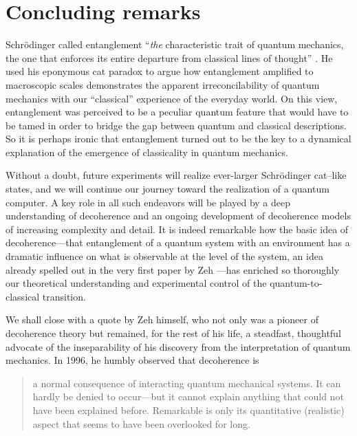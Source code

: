 \documentclass[3p,sort&compress]{elsarticle}
\begin{document}
\section{\label{sec:concluding-remarks}Concluding remarks}

Schr\"odinger called entanglement ``\emph{the} characteristic trait of quantum mechanics, the one that enforces its entire departure from classical lines of thought'' \cite[p.~555]{Schrodinger:1935:jn}. He used his eponymous cat paradox to argue how entanglement amplified to macroscopic scales demonstrates the apparent irreconcilability of quantum mechanics with our ``classical'' experience of the everyday world. On this view, entanglement was perceived to be a peculiar quantum feature that would have to be tamed in order to bridge the gap between quantum and classical descriptions. So it is perhaps ironic that entanglement turned out to be the key to a dynamical explanation of the emergence of classicality in quantum mechanics. 

Without a doubt, future experiments will realize ever-larger Schr\"odinger cat--like states, and we will continue our journey toward the realization of a quantum computer. A key role in all such endeavors will be played by a deep understanding of decoherence and an ongoing development of decoherence models of increasing complexity and detail. It is indeed remarkable how the basic idea of decoherence---that entanglement of a quantum system with an environment has a dramatic influence on what is observable at the level of the system, an idea already spelled out in the very first paper by Zeh \cite{Zeh:1970:yt}---has enriched so thoroughly our theoretical understanding and experimental control of the quantum-to-classical transition. 

We shall close with a quote by Zeh himself, who not only was a pioneer of decoherence theory but remained, for the rest of his life, a steadfast, thoughtful advocate of the inseparability of his discovery from the interpretation of quantum mechanics. In 1996, he humbly observed \cite{Zeh:1996:gy} that decoherence is 
%
\begin{quote}
a normal consequence of interacting quantum mechanical systems. It can hardly be denied to occur---but it cannot explain anything that could not have been explained before. Remarkable is only its quantitative (realistic) aspect that seems to have been overlooked for long. 
\end{quote}
%

\section*{}
\end{document}
